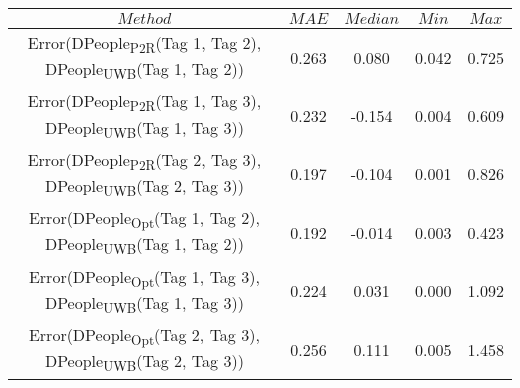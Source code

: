 \begin{table}[h]
\centering
{\small
\begin{tabular}{|c|c|c|c|c|}
\hline
$Method$ & $MAE$ & $Median$ & $Min$ & $Max$ \\
\hline
{\scriptsize Error(DPeople\textsubscript{P2R}(Tag 1, Tag 2), DPeople\textsubscript{UWB}(Tag 1, Tag 2))} & 0.263 & 0.080 & 0.042 & 0.725 \\
\hline
{\scriptsize Error(DPeople\textsubscript{P2R}(Tag 1, Tag 3), DPeople\textsubscript{UWB}(Tag 1, Tag 3))} & 0.232 & -0.154 & 0.004 & 0.609 \\
\hline
{\scriptsize Error(DPeople\textsubscript{P2R}(Tag 2, Tag 3), DPeople\textsubscript{UWB}(Tag 2, Tag 3))} & 0.197 & -0.104 & 0.001 & 0.826 \\
\hline
{\scriptsize Error(DPeople\textsubscript{Opt}(Tag 1, Tag 2), DPeople\textsubscript{UWB}(Tag 1, Tag 2))} & 0.192 & -0.014 & 0.003 & 0.423 \\
\hline
{\scriptsize Error(DPeople\textsubscript{Opt}(Tag 1, Tag 3), DPeople\textsubscript{UWB}(Tag 1, Tag 3))} & 0.224 & 0.031 & 0.000 & 1.092 \\
\hline
{\scriptsize Error(DPeople\textsubscript{Opt}(Tag 2, Tag 3), DPeople\textsubscript{UWB}(Tag 2, Tag 3))} & 0.256 & 0.111 & 0.005 & 1.458 \\
\hline
\end{tabular}
}
\end{table}
